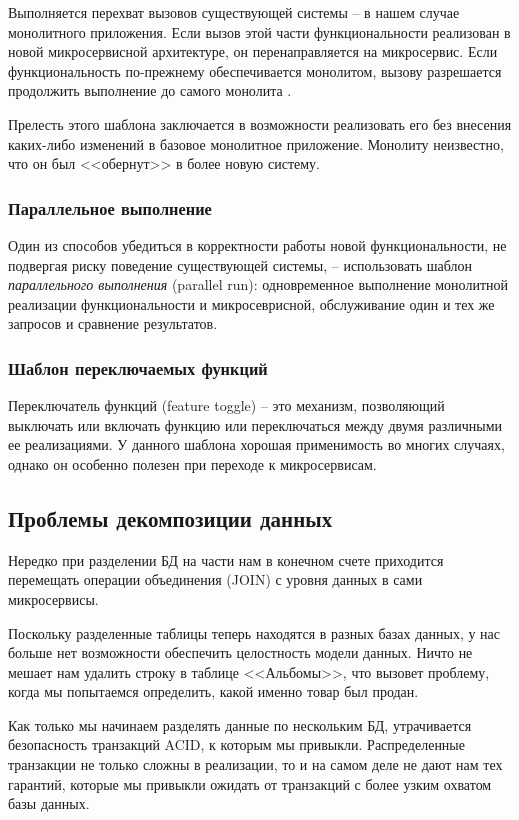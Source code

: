 \documentclass[%
	11pt,
	a4paper,
	utf8,
		]{article}
\begin{document}
Выполняется перехват вызовов существующей системы -- в нашем случае монолитного приложения. Если вызов этой части функциональности реализован в новой микросервисной архитектуре, он перенаправляется на микросервис. Если функциональность по-прежнему обеспечивается монолитом, вызову разрешается продолжить выполнение до самого монолита \cite[]{microservices-2024}.

Прелесть этого шаблона заключается в возможности реализовать его без внесения каких-либо изменений в базовое монолитное приложение. Монолиту неизвестно, что он был <<обернут>> в более новую систему.

\subsubsection{Параллельное выполнение}

Один из способов убедиться в корректности работы новой функциональности, не подвергая риску поведение существующей системы, -- использовать шаблон \emph{параллельного выполнения} (parallel run): одновременное выполнение монолитной реализации функциональности и микросеврисной, обслуживание один и тех же запросов и сравнение результатов. 

\subsubsection{Шаблон переключаемых функций}

Переключатель функций (feature toggle) -- это механизм, позволяющий выключать или включать функцию или переключаться между двумя различными ее реализациями. У данного шаблона хорошая применимость во многих случаях, однако он особенно полезен при переходе к микросервисам.

\subsection{Проблемы декомпозиции данных}

Нередко при разделении БД на части нам в конечном счете приходится перемещать операции объединения (JOIN) с уровня данных в сами микросервисы.

Поскольку разделенные таблицы теперь находятся в разных базах данных, у нас больше нет возможности обеспечить целостность модели данных. Ничто не мешает нам удалить строку в таблице <<Альбомы>>, что вызовет проблему, когда мы попытаемся определить, какой именно товар был продан.

Как только мы начинаем разделять данные по нескольким БД, утрачивается безопасность транзакций ACID, к которым мы привыкли. Распределенные транзакции не только сложны в реализации, то и на самом деле не дают нам тех гарантий, которые мы привыкли ожидать от транзакций с более узким охватом базы данных.
\end{document}
